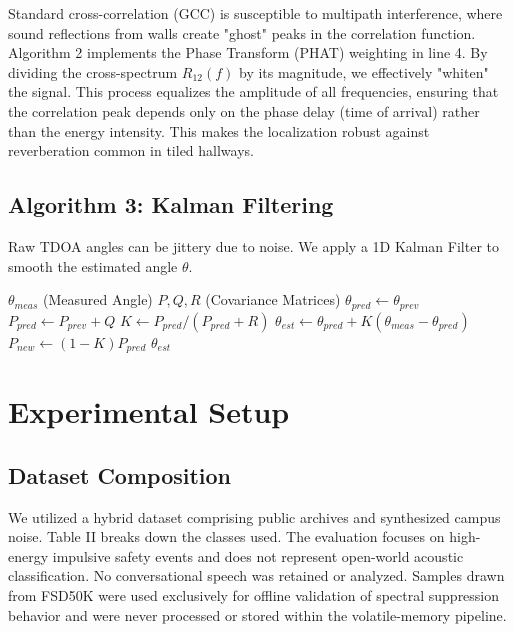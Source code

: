 \documentclass[conference]{IEEEtran}
\begin{document}
Standard cross-correlation (GCC) is susceptible to multipath interference, where sound reflections from walls create "ghost" peaks in the correlation function. Algorithm 2 implements the Phase Transform (PHAT) weighting in line 4. By dividing the cross-spectrum $R_{12}(f)$ by its magnitude, we effectively "whiten" the signal. This process equalizes the amplitude of all frequencies, ensuring that the correlation peak depends only on the phase delay (time of arrival) rather than the energy intensity. This makes the localization robust against reverberation common in tiled hallways.

\subsection{Algorithm 3: Kalman Filtering}
Raw TDOA angles can be jittery due to noise. We apply a 1D Kalman Filter to smooth the estimated angle $\theta$.

\begin{algorithm}
\caption{Kalman Angle Smoothing}
\begin{algorithmic}[1]
\REQUIRE $\theta_{meas}$ (Measured Angle)
\REQUIRE $P, Q, R$ (Covariance Matrices)
\STATE $ \theta_{pred} \gets \theta_{prev} $ 
\STATE $ P_{pred} \gets P_{prev} + Q $
\STATE $ K \gets P_{pred} / (P_{pred} + R) $ 
\STATE $ \theta_{est} \gets \theta_{pred} + K(\theta_{meas} - \theta_{pred}) $ 
\STATE $ P_{new} \gets (1 - K)P_{pred} $
\RETURN $\theta_{est}$
\end{algorithmic}
\label{alg:kalman}
\end{algorithm}

\section{Experimental Setup}

\subsection{Dataset Composition}
We utilized a hybrid dataset comprising public archives and synthesized campus noise. Table II breaks down the classes used. The evaluation focuses on high-energy impulsive safety events and does not represent open-world acoustic classification. No conversational speech was retained or analyzed. Samples drawn from FSD50K were used exclusively for offline validation of spectral suppression behavior and were never processed or stored within the volatile-memory pipeline.
\end{document}
